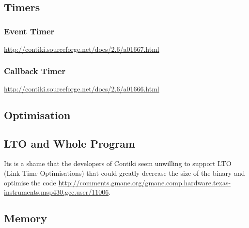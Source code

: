 \subsection{Timers}

\subsubsection{Event Timer}

\url{http://contiki.sourceforge.net/docs/2.6/a01667.html}

\subsubsection{Callback Timer}

\url{http://contiki.sourceforge.net/docs/2.6/a01666.html}


\subsection{Optimisation}

\subsection{LTO and Whole Program}

Its is a shame that the developers of Contiki seem unwilling to support LTO (Link-Time Optimisations) that could greatly decrease the size of the binary and optimise the code \url{http://comments.gmane.org/gmane.comp.hardware.texas-instruments.msp430.gcc.user/11006}.

\subsection{Memory}

